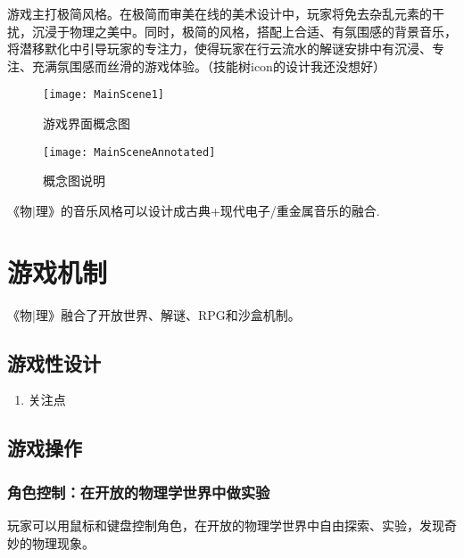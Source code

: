 \documentclass{tstextbook}
\begin{document}
游戏主打极简风格。在极简而审美在线的美术设计中，玩家将免去杂乱元素的干扰，沉浸于物理之美中。同时，极简的风格，搭配上合适、有氛围感的背景音乐，将潜移默化中引导玩家的专注力，使得玩家在行云流水的解谜安排中有沉浸、专注、充满氛围感而丝滑的游戏体验。（技能树icon的设计我还没想好）

\begin{figure}[H]
\centering
\texttt{[image: MainScene1]} 
\caption{游戏界面概念图}
\label{MainScene}
\end{figure}

\begin{figure}[H]
\centering
\texttt{[image: MainSceneAnnotated]} 
\caption{概念图说明}
\label{MainScene}
\end{figure}

《物$|$理》的音乐风格可以设计成古典+现代电子/重金属音乐的融合.

\chapter{游戏机制}

\begin{summary}
《物$|$理》融合了开放世界、解谜、RPG和沙盒机制。
\end{summary}

\section{游戏性设计}

\begin{enumerate}

\item{关注点}



\end{enumerate}


\section{游戏操作}

\subsection{角色控制：在开放的物理学世界中做实验}

玩家可以用鼠标和键盘控制角色，在开放的物理学世界中自由探索、实验，发现奇妙的物理现象。
\end{document}
